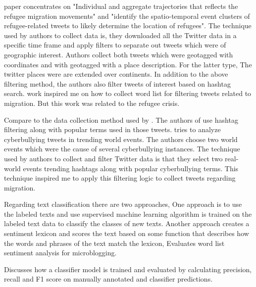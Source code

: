 \cite{Hübl} paper concentrates on "Individual and aggregate trajectories that reflects the refugee migration
movements" and "identify the spatio-temporal event clusters of refugee-related tweets to
likely determine the location of refugees". The technique used by authors to collect data is, they
downloaded all the Twitter data in a specific time frame and apply filters to separate out tweets
which were of geographic interest. Authors collect both tweets which were geotagged with coordinates
and with geotagged with a place description. For the latter type, The twitter places were
are extended over continents. In addition to the above filtering method, the authors also filter tweets
of interest based on hashtag search. \cite{Hübl} work inspired me on how to collect word list for filtering
tweets related to migration. But this work was related to the refugee crisis.
 
Compare to the data collection method used by \cite{Hübl}. The authors of \cite{Cortis} use hashtag filtering
along with popular terms used in those tweets. \cite{Cortis} tries to analyze cyberbullying tweets in trending
world events. The authors choose two world events which were the cause of several cyberbullying instances.
The technique used by authors to collect and filter Twitter data is that they select two real-world
events trending hashtags along with popular cyberbullying terms. This technique inspired me to
apply this filtering logic to collect tweets regarding migration.


Regarding text classification there are two approaches, One approach is to use the labeled texts and use supervised machine learning algorithm is  trained on the labeled text data to classify the classes
of new texts. Another approach creates a sentiment lexicon and scores the text based on some function that describes how the words and phrases of the text match the lexicon, \cite{DBLP} Evaluates word list sentiment analysis for microblogging.

 \cite{Jamie} Discusses how a classifier model is trained
and evaluated by calculating precision, recall and F1 score on manually annotated and classifier
predictions.



